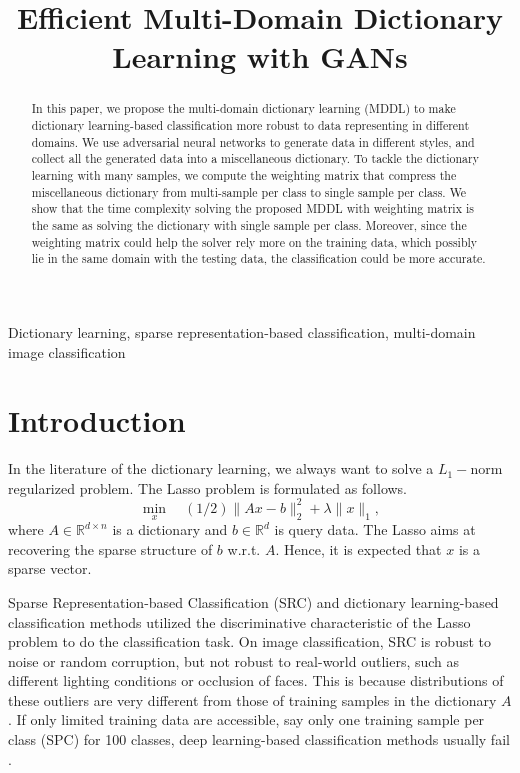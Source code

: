 \documentclass{article}
\title{Efficient Multi-Domain Dictionary Learning with GANs}
\begin{document}
%
\maketitle
%
\begin{abstract}
In this paper, we propose the multi-domain dictionary learning (MDDL) to make dictionary learning-based classification more robust to data representing in different domains. We use adversarial neural networks to generate data in different styles, and collect all the generated data into a miscellaneous dictionary. To tackle the dictionary learning with many samples, we compute the weighting matrix that compress the miscellaneous dictionary from multi-sample per class to single sample per class. We show that the time complexity solving the proposed MDDL with weighting matrix is the same as solving the dictionary with single sample per class. Moreover, since the weighting matrix could help the solver rely more on the training data, which possibly lie in the same domain with the testing data, the classification could be more accurate. 
\end{abstract}
%
\begin{keywords}
Dictionary learning, sparse representation-based classification, multi-domain image classification
\end{keywords}
%
\section{Introduction}
\label{sec:intro}

In the literature of the dictionary learning, we always want to solve a $L_1-$norm regularized problem. 
The Lasso problem \cite{tibshirani1996regression} is formulated as follows.
\begin{equation}
\label{v_lasso}
\min_x \quad(1/2)\|Ax-b\|^2_2+\lambda\|x\|_1 ,
\end{equation}
where $A \in \mathbb{R}^{d \times n}$ is a dictionary and $b \in \mathbb{R}^{d}$ is query data. The Lasso aims at recovering the sparse structure of $b$ w.r.t. $A$. Hence, it is expected that $x$ is a sparse vector.

Sparse Representation-based Classification (SRC) \cite{wright2009pami} and dictionary learning-based classification methods utilized the discriminative characteristic of the Lasso problem to do the classification task. On image classification, SRC is robust to noise or random corruption, but not robust to real-world outliers, such as different lighting conditions or occlusion of faces. This is because distributions of these outliers are very different from those of training samples in the dictionary $A$. If only limited training data are accessible, say only one training sample per class (SPC) for 100 classes, deep learning-based classification methods usually fail \cite{wu2018occluded} \cite{ghazi2016cvprw}.
\end{document}
